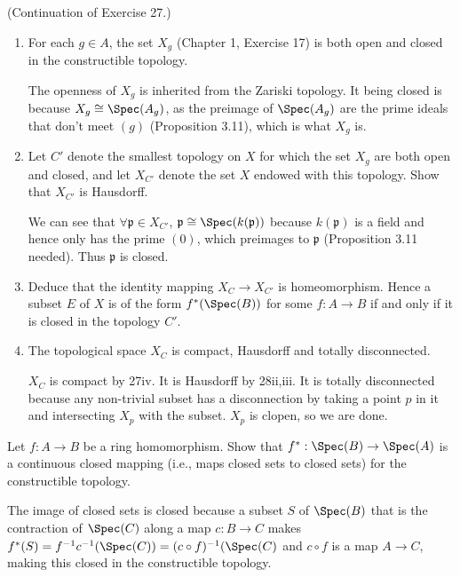 \documentclass[a4paper]{exam}
\begin{document}
\begin{questions}
\question (Continuation of Exercise 27.)
\begin{enumerate}
\item For each $g \in A $, the set $X_g $ (Chapter 1, Exercise 17) is both open and closed in the constructible topology.
\begin{solution}
	The openness of $X_g $ is inherited from the Zariski topology.
	It being closed is because $X_g \cong \Spec(A_g) $, as the preimage of $\Spec(A_g) $ are the prime ideals that don't meet $(g) $ (Proposition 3.11), which is what $X_g$ is.
\end{solution}
\item Let $C' $ denote the smallest topology on $X $ for which the set $X_g $ are both open and closed, and let $X_{C'} $ denote the set $X $ endowed with this topology. Show that $X_{C'} $ is Hausdorff.
\begin{solution}
	We can see that $\forall \mathfrak{p} \in X_{C'} $, $\mathfrak{p} \cong \Spec(k(\mathfrak{p})) $ because $k(\mathfrak{p}) $ is a field and hence only has the prime $(0) $, which preimages to $\mathfrak{p} $ (Proposition 3.11 needed).
	Thus $\mathfrak{p} $ is closed.
\end{solution}
\item Deduce that the identity mapping $X_C \to X_{C'} $ is homeomorphism. Hence a subset $E $ of $X $ is of the form $f^\ast(\Spec(B)) $ for some $f: A\to B $ if and only if it is closed in the topology $C' $.
\begin{solution}
	
\end{solution}
\item The topological space $X_C $ is compact, Hausdorff and totally disconnected.
\begin{solution}
	$X_C $ is compact by 27iv.
	It is Hausdorff by 28ii,iii.
	It is totally disconnected because any non-trivial subset has a disconnection by taking a point $p $ in it and intersecting $X_p $ with the subset.
	$X_p $ is clopen, so we are done.
\end{solution}
\end{enumerate}

\question Let $f: A\to B $ be a ring homomorphism. Show that $f^\ast: \Spec(B) \to \Spec(A) $ is a continuous closed mapping (i.e., maps closed sets to closed sets) for the constructible topology.
\begin{solution}
	The image of closed sets is closed because a subset $S $ of $\Spec(B) $ that is the contraction of $\Spec(C) $ along a map $c: B \to C $ makes $f^\ast(S) = f^{-1}c^{-1}(\Spec(C)) = (c\circ f)^{-1}(\Spec(C)$ and $c\circ f $ is a map $A\to C $, making this closed in the constructible topology.


\end{solution}
\end{questions}
\end{document}
